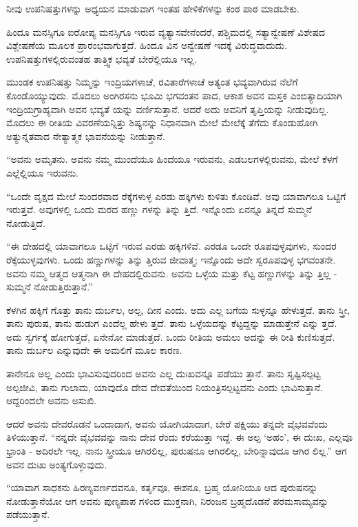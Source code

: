 ನೀವು ಉಪನಿಷತ್ತುಗಳನ್ನು ಅಧ್ಯಯನ ಮಾಡುವಾಗ ಇಂತಹ ಹೇಳಿಕೆಗಳನ್ನು ಕಂಠ ಪಾಠ ಮಾಡಬೇಕು.

ಹಿಂದೂ ಮನಸ್ಸಿಗೂ ಐರೋಪ್ಯ ಮನಸ್ಸಿಗೂ ಇರುವ ವ್ಯತ್ಯಾಸವೇನೆಂದರೆ, ಪಶ್ಚಿಮದಲ್ಲಿ ಸತ್ಯಾನ್ವೇಷಣೆ ವಿಶೇಷದ ವಿಶ್ಲೇಷಣೆಯ ಮೂಲಕ ಪ್ರಾರಂಭವಾಗುತ್ತದೆ. ಹಿಂದೂ ವಿನ ಅನ್ವೇಷಣೆ ಇದಕ್ಕೆ ವಿರುದ್ಧವಾದುದು. ಉಪನಿಷತ್ತುಗಳಲ್ಲಿರುವಂತಹ ತಾತ್ತ್ವಿಕ ಭವ್ಯತೆ ಬೇರೆಲ್ಲಿಯೂ ಇಲ್ಲ.

ಮುಂಡಕ ಉಪನಿಷತ್ತು ನಿಮ್ಮನ್ನು ಇಂದ್ರಿಯಗಳಾಚೆ, ರವಿತಾರೆಗಳಾಚೆ ಅತ್ಯಂತ ಭವ್ಯವಾಗಿರುವ ನೆಲೆಗೆ ಕೊಂಡೊಯ್ಯುವುದು. ಮೊದಲು ಅಂಗಿರಸನು ಭೂಮಿ ಭಗವಂತನ ಪಾದ, ಆಕಾಶ ಅವನ ಮಸ್ತಕ ಎಂಬಿತ್ಯಾದಿಯಾಗಿ ಇಂದ್ರಿಯಗ್ರಾಹ್ಯವಾಗಿ ಅವನ ಭವ್ಯತೆ ಯನ್ನು ವರ್ಣಿಸುತ್ತಾನೆ. ಆದರೆ ಅದು ಅವನಿಗೆ ತೃಪ್ತಿಯನ್ನು ನೀಡುವುದಿಲ್ಲ. ಮೊದಲು ಈ ರೀತಿಯ ವಿವರಣೆಯನ್ನಿತ್ತು ಶಿಷ್ಯನನ್ನು ನಿಧಾನವಾಗಿ ಮೇಲೆ ಮೇಲೆಕ್ಕೆ ತೆಗೆದು ಕೊಂಡುಹೋಗಿ ಅತ್ಯುನ್ನತವಾದ ನೇತ್ಯಾತ್ಮಕ ಭಾವನೆಯನ್ನು ನೀಡುತ್ತಾನೆ.

“ಅವನು ಅಮೃತನು. ಅವನು ನಮ್ಮ ಮುಂದೆಯೂ ಹಿಂದೆಯೂ ಇರುವನು, ಎಡಬಲಗಳಲ್ಲಿರುವನು, ಮೇಲೆ ಕೆಳಗೆ ಎಲ್ಲೆಲ್ಲಿಯೂ ಇರುವನು.

“ಒಂದೇ ವೃಕ್ಷದ ಮೇಲೆ ಸುಂದರವಾದ ರೆಕ್ಕೆಗಳುಳ್ಳ ಎರಡು ಹಕ್ಕಿಗಳು ಕುಳಿತು ಕೊಂಡಿವೆ. ಅವು ಯಾವಾಗಲೂ ಒಟ್ಟಿಗೆ ಇರುತ್ತವೆ. ಅವುಗಳಲ್ಲಿ ಒಂದು ಮರದ ಹಣ್ಣು ಗಳನ್ನು ತಿನ್ನು ತ್ತಿದೆ. ಇನ್ನೊಂದು ಏನನ್ನೂ ತಿನ್ನದೆ ಸುಮ್ಮನೆ ನೋಡುತ್ತಿದೆ.

“ಈ ದೇಹದಲ್ಲಿ ಯಾವಾಗಲೂ ಒಟ್ಟಿಗೆ ಇರುವ ಎರಡು ಹಕ್ಕಿಗಳಿವೆ. ಎರಡೂ ಒಂದೇ ರೂಪವುಳ್ಳವುಗಳು, ಸುಂದರ ರೆಕ್ಕೆಯುಳ್ಳವುಗಳು. ಒಂದು ಹಣ್ಣುಗಳನ್ನು ತಿನ್ನು ತ್ತಿರುವ ಜೀವಾತ್ಮ; ಇನ್ನೊಂದು ಅದೇ ಸ್ವರೂಪವುಳ್ಳ ಭಗವಂತನೇ. ಅವನು ನಮ್ಮ ಆತ್ಮದ ಆತ್ಮನಾಗಿ ಈ ದೇಹದಲ್ಲಿರುವನು. ಅವನು ಒಳ್ಳೆಯ ಮತ್ತು ಕೆಟ್ಟ ಹಣ್ಣುಗಳನ್ನು ತಿನ್ನು ತ್ತಿಲ್ಲ - ಸುಮ್ಮನೆ ನೋಡುತ್ತಿರುತ್ತಾನೆ.”

ಕೆಳಗಿನ ಹಕ್ಕಿಗೆ ಗೊತ್ತು ತಾನು ದುರ್ಬಲ, ಅಲ್ಪ, ದೀನ ಎಂದು. ಅದು ಎಲ್ಲ ಬಗೆಯ ಸುಳ್ಳನ್ನೂ ಹೇಳುತ್ತದೆ. ತಾನು ಸ್ತ್ರೀ, ತಾನು ಪುರುಷ, ತಾನು ಹುಡುಗ ಎಂದೆಲ್ಲ ಹೇಳು ತ್ತದೆ. ತಾನು ಒಳ್ಳೆಯದನ್ನು ಕೆಟ್ಟದ್ದನ್ನು ಮಾಡುತ್ತೇನೆ ಎನ್ನು ತ್ತದೆ. ಅದು ಸ್ವರ್ಗಕ್ಕೆ ಹೋಗುತ್ತದೆ, ಏನೇನೋ ಮಾಡುತ್ತದೆ. ಒಂದು ರೀತಿಯ ಅಮಲು ಅದನ್ನು ಈ ರೀತಿ ಕುಣಿಸುತ್ತದೆ. ತಾನು ದುರ್ಬಲ ಎನ್ನುವುದೇ ಈ ಅಮಲಿಗೆ ಮೂಲ ಕಾರಣ.

ತಾನೇನೂ ಅಲ್ಲ ಎಂದು ಭಾವಿಸುವುದರಿಂದ ಅವನು ಎಲ್ಲ ದುಃಖವನ್ನೂ ಪಡೆಯು ತ್ತಾನೆ. ತಾನು ಸೃಷ್ಟಿಸಲ್ಪಟ್ಟ ಅಲ್ಪಜೀವಿ, ತಾನು ಗುಲಾಮ, ಯಾವುದೊ ದೇವ ದೇವತೆಯಿಂದ ನಿಯಂತ್ರಿಸಲ್ಪಟ್ಟವನು ಎಂದು ಭಾವಿಸುತ್ತಾನೆ. ಆದ್ದರಿಂದಲೇ ಅವನು ಅಸುಖಿ.

ಆದರೆ ಅವನು ದೇವರೊಡನೆ ಒಂದಾದಾಗ, ಅವನು ಯೋಗಿಯಾದಾಗ, ಬೇರೆ ಪಕ್ಷಿಯು ತನ್ನದೇ ವೈಭವವೆಂದು ತಿಳಿಯುತ್ತಾನೆ. “ನನ್ನದೇ ವೈಭವವನ್ನು ನಾನು ದೇವ ರೆಂದು ಕರೆಯುತ್ತಾ ಇದ್ದೆ. ಈ ಅಲ್ಪ ‘ಅಹಂ’, ಈ ದುಃಖ, ಎಲ್ಲವೂ ಭ್ರಾಂತಿ - ಅದಿರಲೇ ಇಲ್ಲ. ನಾನು ಸ್ತ್ರೀಯೂ ಆಗಿರಲಿಲ್ಲ, ಪುರುಷನೂ ಆಗಿರಲಿಲ್ಲ, ಬೇರಿನ್ನಾವುದೂ ಆಗಿರ ಲಿಲ್ಲ.” ಆಗ ಅವನ ದುಃಖ ಅಂತ್ಯಗೊಳ್ಳುವುದು.

“ಯಾವಾಗ ಸಾಧಕನು ಹಿರಣ್ಯವರ್ಣದವನೂ, ಕರ್ತೃವೂ, ಈಶನೂ, ಬ್ರಹ್ಮ ಯೋನಿಯೂ ಆದ ಪುರುಷನನ್ನು ನೋಡುತ್ತಾನೆಯೋ ಆಗ ಅವನು ಪುಣ್ಯಪಾಪ ಗಳಿಂದ ಮುಕ್ತನಾಗಿ, ನಿರಂಜನ ಬ್ರಹ್ಮದೊಡನೆ ಪರಮಸಾಮ್ಯವನ್ನು ಪಡೆಯುತ್ತಾನೆ.

